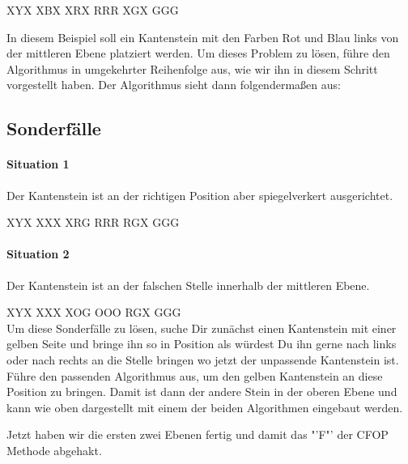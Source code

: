 \RubikCubeGreyAll%
            {X}{Y}{X}
            {X}{B}{X}%
               {X}{R}{X}
	       {R}{R}{R}%
	       {X}{G}{X}
	       {G}{G}{G}%
\parbox{0.7\linewidth}{
  In diesem Beispiel soll ein Kantenstein mit den Farben Rot und Blau links von
  der mittleren Ebene platziert werden. Um dieses Problem zu lösen, führe den
  Algorithmus in umgekehrter Reihenfolge aus, wie wir ihn in diesem Schritt
  vorgestellt haben. Der Algorithmus sieht dann folgendermaßen aus:
}
\begin{center}
\end{center}

\subsection{Sonderfälle}

\parbox{0.7\linewidth}{
  \paragraph{Situation 1}
  Der Kantenstein ist an der richtigen Position aber spiegelverkert ausgerichtet.\\[1em]
}
\RubikCubeGreyAll%
            {X}{Y}{X}
            {X}{X}{X}%
               {X}{R}{G}
	       {R}{R}{R}%
	       {R}{G}{X}
	       {G}{G}{G}%
\\[1em]
\parbox{0.7\linewidth}{
  \paragraph{Situation 2}
  Der Kantenstein ist an der falschen Stelle innerhalb der mittleren Ebene.\\[1em]
}
\RubikCubeGreyAll%
            {X}{Y}{X}
            {X}{X}{X}%
               {X}{O}{G}
	       {O}{O}{O}%
	       {R}{G}{X}
	       {G}{G}{G}%
\\[1em]

Um diese Sonderfälle zu lösen, suche Dir zunächst einen Kantenstein mit einer
gelben Seite und bringe ihn so in Position als würdest Du ihn gerne nach links
oder nach rechts an die Stelle bringen wo jetzt der unpassende Kantenstein ist.
Führe den passenden Algorithmus aus, um den gelben Kantenstein an diese Position
zu bringen. Damit ist dann der andere Stein in der oberen Ebene und kann wie
oben dargestellt mit einem der beiden Algorithmen eingebaut werden.

Jetzt haben wir die ersten zwei Ebenen fertig und damit das "'F"' der CFOP Methode abgehakt.
